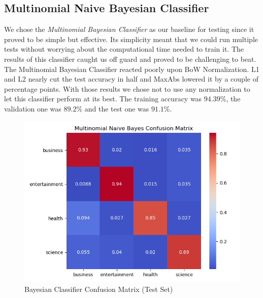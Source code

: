 \documentclass[10pt,a4paper]{report}
\begin{document}
\subsection{Multinomial Naive Bayesian Classifier}
We chose the \textit{Multinomial Bayesian Classifier} as our baseline for testing since it proved to be simple but effective. Its simplicity meant that we could run multiple tests without worrying about the computational time needed to train it. The results of this classifier caught us off guard and proved to be challenging to beat. The Multinomial Bayesian Classifier reacted poorly upon BoW Normalization. L1 and L2 nearly cut the test accuracy in half and MaxAbs lowered it by a couple of percentage points. With those results we chose not to use any normalization to let this classifier perform at its best. The training accuracy was $94.39 \%$, the validation one was $89.2 \%$ and the test one was $91.1 \%$.
\begin{figure}[!ht]
\centering
\includegraphics[width=0.5\linewidth]{bayes_confmat.png}
\caption{Bayesian Classifier Confusion Matrix (Test Set)}
\label{fig:bayes_confmat}
\end{figure}
\end{document}
